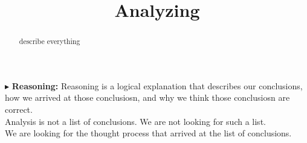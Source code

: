 \documentclass{ximera}
\title{Analyzing}
\begin{document}
\begin{abstract}
describe everything
\end{abstract}
\maketitle







$\blacktriangleright$ \textbf{\textcolor{red!80!black}{Reasoning:}} Reasoning is a logical explanation that describes our conclusions, how we arrived at those conclusiosn, and why we think those conclusiosn are correct. \\

Analysis is not a list of conclusions. We are not looking for such a list. \\

We are looking for the thought process that arrived at the list of conclusions. \\
\end{document}
